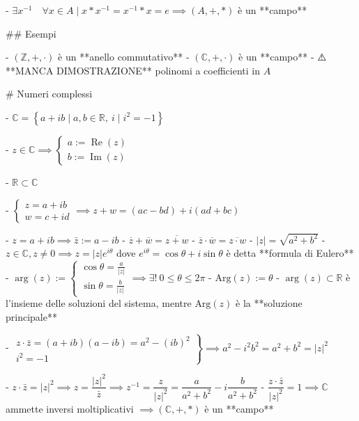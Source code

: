 - \(\exists x^{-1} \quad \forall x \in A \mid x * x^{-1}=x^{-1} * x=e  \implies  (A, +, *)\) è un **campo**

## Esempi

- $(\mathbb{Z}, +, \cdot)$ è un **anello commutativo**
- $(\mathbb{C}, +, \cdot)$ è un **campo**
- ⚠️ **MANCA DIMOSTRAZIONE** polinomi a coefficienti in $A$

# Numeri complessi

- \(\mathbb{C}=\left\{a+i b \mid a, b \in \mathbb{R}, \  i \mid i^{2}=-1\right\} \)

- \( z \in \mathbb{C} \implies\left\{\begin{array}{l}a:=\operatorname{Re}(z) \\ b:=\operatorname{Im}(z)\end{array}\right. \)

- \( \mathbb{R} \subset \mathbb{C} \)

- \(
\left\{\begin{array}{l}
z=a+i b \\
w=c+i d
\end{array} \implies z+w=(a c-b d)+i(ad+ bc)\right.
\)

- \( z=a+i b \implies \bar{z}:=a-i b \)
  - \( \overline{z}+\overline{w}=\overline{z+w} \)
  - \( \overline{z} \cdot \overline{w}=\overline{z \cdot w} \)
- \( |z|=\sqrt{a^{2}+b^{2}} \)
  - \( z \in \mathbb{C}, z \neq 0 \implies z=|z| e^{i \theta} \) dove \( e^{i \theta}=\cos \theta+i \sin \theta \) è detta **formula di Eulero**
  - \( \arg(z) := \left\{\begin{array}{l}\cos \theta=\frac{a}{|z|} \\ \sin \theta=\frac{b}{|z|}\end{array}\right. \implies \exists ! \ 0 \leq \theta \le 2 \pi \)
    - \( \textrm{Arg}(z) :=\theta \)
    - \(\arg(z) \subset \mathbb{R}\) è l'insieme delle soluzioni del sistema, mentre $\textrm{Arg}(z)$ è la **soluzione principale**

- \(
\left.\begin{array}{l}
z \cdot \bar{z}=(a+i b)(a-i b)=a^{2}-(i b)^{2} \\
i^{2}=-1
\end{array} \right \} \implies a^{2}-i^{2} b^{2}=a^{2}+b^{2}=|z|^{2} 
\)

  - \( z \cdot \bar{z}=|z|^{2} \implies z=\dfrac{|z|^{2}}{\bar{z}} \implies z^{-1}=\dfrac{z}{|z|^{2}} = \dfrac{a}{a^2+b^2}- i \dfrac{b}{a^2+b^2}\)
  - \( \dfrac{z \cdot \bar{z}}{|z|^{2}}=1 \implies \mathbb{C}\) ammette inversi moltiplicativi \( \implies (\mathbb{C}, +, *) \) è un **campo**

